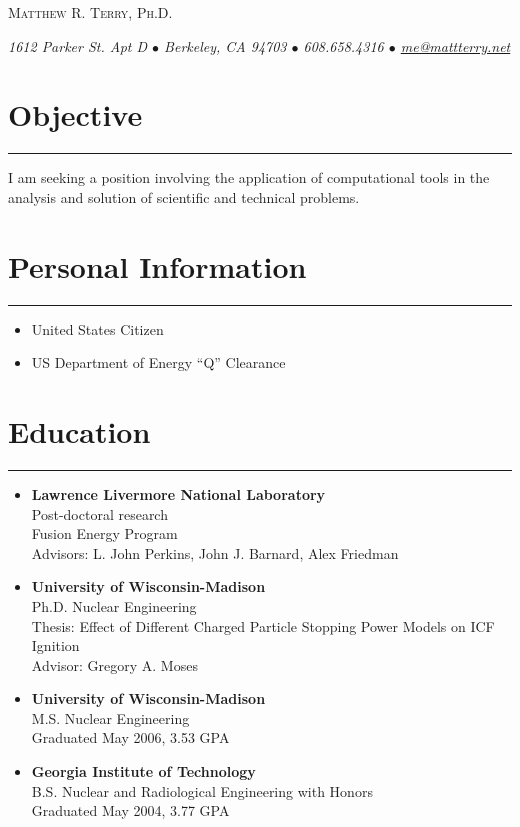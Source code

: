 \documentclass[letterpaper,11pt]{article}
\def\name{Matthew R. Terry, Ph.D.}
\begin{document}
\begin{center}
	{\huge\scshape \name}

	\textit{%
		1612 Parker St. Apt D $\bullet$
		Berkeley, CA 94703 $\bullet$
		608.658.4316 $\bullet$
		\href{mailto:me@mattterry.net}{me@mattterry.net}
	}
\end{center}

\section*{Objective}
\hrule
\vspace{0.05in}
I am seeking a position involving the application of computational tools in the analysis and solution of scientific and technical problems.

\section*{Personal Information}
\hrule
\vspace{0.05in}
\begin{itemize}
	\item United States Citizen
	\item US Department of Energy ``Q'' Clearance
\end{itemize}


\section*{Education}
\hrule
\vspace{0.05in}
\begin{itemize}
	\item
		\textbf{Lawrence Livermore National Laboratory} \\
		Post-doctoral research \\
		Fusion Energy Program \\
		Advisors: L. John Perkins, John J. Barnard, Alex Friedman
	\item 
		\textbf{University of Wisconsin-Madison} \\
		Ph.D. Nuclear Engineering \\
  		Thesis: Effect of Different Charged Particle Stopping Power Models on ICF Ignition \\
		Advisor: Gregory A. Moses
	\item 
		\textbf{University of Wisconsin-Madison} \\
		M.S. Nuclear Engineering \\
		Graduated May 2006, 3.53 GPA 
	\item 
		\textbf{Georgia Institute of Technology} \\
		B.S. Nuclear and Radiological Engineering with Honors \\
		Graduated May 2004, 3.77 GPA
\end{itemize}
\end{document}
